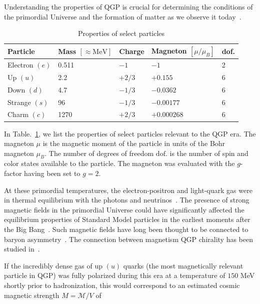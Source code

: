 \documentclass[epjST]{svjour}
\numberwithin{equation}{section}
\begin{document}
Understanding the properties of QGP is crucial for determining the conditions of the primordial Universe and the formation of matter as we observe it today~\cite{Uzan:2010pm,Uzan:2024ded,Grasso:2000wj,Widrow:2002ud,Kandus:2010nw}.
\begin{table}[h]
\centering
\caption{Properties of select particles}
\label{tab:particle_properties}
\begin{tabular}{@{}lllll@{}}
\toprule
\textbf{Particle} & \textbf{Mass} \([\approx\mathrm{MeV}]\) & \textbf{Charge} & \textbf{Magneton} \([\mu/\mu_{B}]\) & \textbf{dof.} \\ 
\midrule
Electron    \((e)\) & 0.511 & \(-1\)    & \(-1\)         & 2 \\
Up          \((u)\) & 2.2   & \(+2/3\)  & \(+0.155\)     & 6 \\
Down        \((d)\) & 4.7   & \(-1/3\)  & \(-0.0362\)    & 6 \\
Strange     \((s)\) & 96    & \(-1/3\)  & \(-0.00177\)   & 6 \\
Charm       \((c)\) & 1270  & \(+2/3\)  & \(+0.000268\)  & 6 \\ 
\bottomrule
\end{tabular}
\end{table}
In Table.~\ref{tab:particle_properties}, we list the properties of select particles relevant to the QGP era. The magneton \(\mu\) is the magnetic moment of the particle in units of the Bohr magneton \(\mu_{B}\). The number of degrees of freedom \(\mathrm{dof.}\) is the number of spin and color states available to the particle. The magneton was evaluated with the \(g\)-factor having been set to \(g=2\).

At these primordial temperatures, the electron-positron and light-quark gas were in thermal equilibrium with the photons and neutrinos~\cite{Rafelski:2023emw}. The presence of strong magnetic fields in the primordial Universe could have significantly affected the equilibrium properties of Standard Model particles in the earliest moments after the Big Bang~\cite{Durrer:2013pga,Subramanian:2015lua}. Such magnetic fields have long been thought to be connected to baryon asymmetry~\cite{Vachaspati:1991nm,Baym:1995fk}. The connection between magnetism QGP chirality has been studied in~\cite{Fukushima:2008xe,Boyarsky:2011uy,Bali:2011qj}.

If the incredibly dense gas of up \((u)\) quarks (the most magnetically relevant particle in QGP) was fully polarized during this era at a temperature of \(150\) MeV shortly prior to hadronization, this would correspond to an estimated cosmic magnetic strength \(M = \mathcal{M}/V\) of
\end{document}
